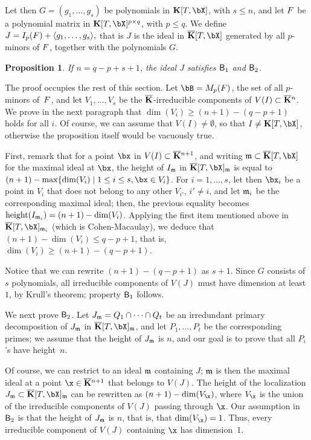 \documentclass[12pt]{article}
\newtheorem{proposition}[definition]{Proposition}
\begin{document}
Let then $G=(g_1,\dots,g_s)$ be polynomials in $\KK[T,\bX]$, with $s
\le n$, and let ${F}$ be a polynomial matrix in $\KK[T,\bX]^{p \times
  q}$, with $p \le q$. We define $J = I_p({F}) + \langle
g_1,\dots,g_s\rangle,$ that is $J$ is the ideal in $\KKbar[T,\bX]$
generated by all $p$-minors of ${F}$, together with the polynomials
$G$.

\begin{proposition}\label{prop:KH1H2}
  If $n=q-p+s+1$, the ideal $J$ satisfies $\mathsf{B}_1$ and $\mathsf{B}_2$.
\end{proposition}

The proof occupies the rest of this section.  Let $\bB=M_p(\mF)$, the
set of all $p$-minors of~${F}$, and let $V_1,\dots,V_s$ be the
$\overline{\mathbf{K}}$-irreducible components of $V(I)\subset \overline{\mathbf{K}}{}^n$.  We prove
in the next paragraph that $\dim(V_i) \ge (n+1) -(q-p+1)$ holds for
all $i$. Of course, we can assume that $V(I)\ne \emptyset$, so that $I
\ne \KK[T,\bX]$, otherwise the proposition itself would be vacuously true.

First, remark that for a point $\bx$ in $V(I)\subset \overline{\mathbf{K}}{}^{n+1}$,
and writing $\m \subset \KKbar[T,\bX]$ for the maximal ideal at $\bx$,
the height of $I_{\mathfrak{m}}$ in $\KKbar[T,\bX]_\m$ is equal to $(n+1)-\max\{
\dim(V_i) \mid 1 \le i \le s, \bx \in V_i\}$. For $i=1,\dots,s$, let
then $\bx_i$ be a point in $V_i$ that does not belong to any other
$V_{i'}$, $i' \ne i$, and let $\mathfrak{m}_i$ be the corresponding maximal
ideal; then, the previous equality becomes ${\rm
  height}(I_{\mathfrak{m}_i})=(n+1)-\dim(V_i)$.  Applying the first item
mentioned above in $\KKbar[T,\bX]_{\m_i}$ (which is Cohen-Macaulay),
we deduce that $(n+1)-\dim(V_i) \le q-p+1$, that is, $\dim(V_i) \ge
(n+1) -(q-p+1)$.

Notice that we can rewrite $(n+1)-(q-p+1)$ as $s+1$.  Since $G$
consists of $s$ polynomials, all irreducible components of $V(J)$ must
have dimension at least $1$, by Krull's theorem;  property
$\mathsf{B}_1$ follows.

We next prove $\mathsf{B}_2$. Let $J_{\mathfrak{m}}=Q_1 \cap \cdots \cap Q_t$ be an
irredundant primary decomposition of $J_{\mathfrak{m}}$ in $\KKbar[T,\bX]_\m$, and
let $P_1,\dots,P_t$ be the corresponding primes; we assume that the
height of $J_{\mathfrak{m}}$ is $n$, and our goal is to prove that all $P_i$'s
have height~$n$.

Of course, we can restrict to an ideal $\mathfrak{m}$ containing $J$; $\mathfrak{m}$ is
then the maximal ideal at a point $\x \in \KKbar{}^{n+1}$ that belongs
to $V(J)$. The height of the localization
$J_\m \subset \KKbar[T,\bX]_\m$ can be rewritten as
$(n+1)-\dim(V_\x)$, where $V_\x$ is the union of the irreducible
components of $V(J)$ passing through $\x$. Our assumption in $\mathsf{B}_2$
is that the height of $J_{\mathfrak{m}}$ is $n$, that is, that
$\dim(V_\x)=1$. Thus, every irreducible component of $V(J)$ containing
$\x$ has dimension~$1$.
\end{document}
